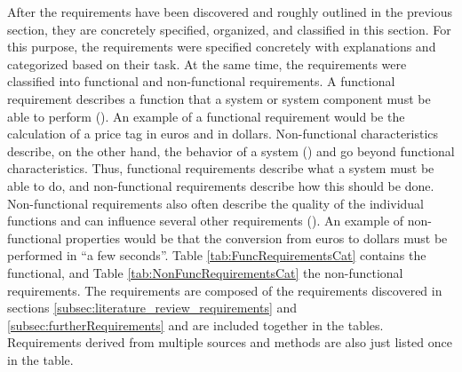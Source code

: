 After the requirements have been discovered and roughly outlined in the previous section, they are concretely specified, organized, and classified in this section. For this purpose, the requirements were specified concretely with explanations and categorized based on their task. At the same time, the requirements were classified into functional and non-functional requirements. A functional requirement describes a function that a system or system component must be able to perform (\cite{IEEE.1990}). An example of a functional requirement would be the calculation of a price tag in euros and in dollars. Non-functional characteristics describe, on the other hand, the behavior of a system (\cite{Seacord.2003}) and go beyond functional characteristics. Thus, functional requirements describe what a system must be able to do, and non-functional requirements describe how this should be done. Non-functional requirements also often describe the quality of the individual functions and can influence several other requirements (\cite{Balzert.2011}). An example of non-functional properties would be that the conversion from euros to dollars must be performed in \enquote{a few seconds}. Table \ref{tab:FuncRequirementsCat} contains the functional, and Table \ref{tab:NonFuncRequirementsCat} the non-functional requirements. The requirements are composed of the requirements discovered in sections \ref{subsec:literature_review_requirements} and \ref{subsec:furtherRequirements} and are included together in the tables. Requirements derived from multiple sources and methods are also just listed once in the table.



